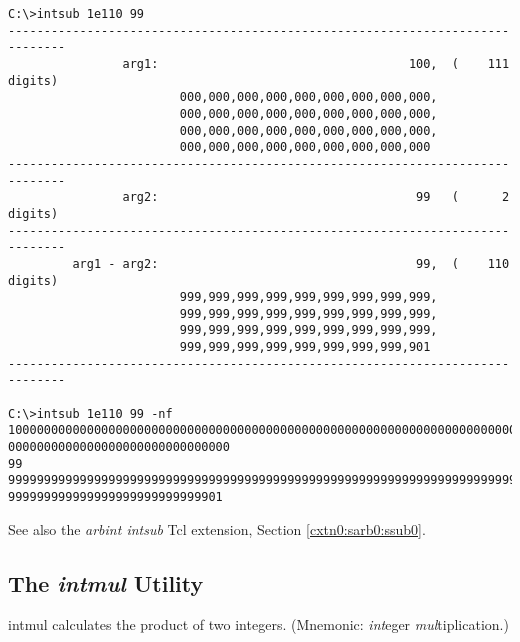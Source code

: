 \begin{dosutilcommandsampleinvocations}
\begin{scriptsize}
\begin{verbatim}
C:\>intsub 1e110 99
------------------------------------------------------------------------------
                arg1:                                   100,  (    111 digits)
                        000,000,000,000,000,000,000,000,000,
                        000,000,000,000,000,000,000,000,000,
                        000,000,000,000,000,000,000,000,000,
                        000,000,000,000,000,000,000,000,000
------------------------------------------------------------------------------
                arg2:                                    99   (      2 digits)
------------------------------------------------------------------------------
         arg1 - arg2:                                    99,  (    110 digits)
                        999,999,999,999,999,999,999,999,999,
                        999,999,999,999,999,999,999,999,999,
                        999,999,999,999,999,999,999,999,999,
                        999,999,999,999,999,999,999,999,901
------------------------------------------------------------------------------

C:\>intsub 1e110 99 -nf
10000000000000000000000000000000000000000000000000000000000000000000000000000000
0000000000000000000000000000000
99
99999999999999999999999999999999999999999999999999999999999999999999999999999999
999999999999999999999999999901
\end{verbatim}
\end{scriptsize}
\end{dosutilcommandsampleinvocations}

\begin{dosutilcommandseealso}
See also the \emph{arbint intsub} Tcl extension, 
Section \ref{cxtn0:sarb0:ssub0}.
\end{dosutilcommandseealso}


\subsection{The \emph{intmul} Utility}
\label{cdcm0:sali0:smul0}

\begin{dosutilcommandname}{intmul}%
calculates the product of
two integers.  (Mnemonic:  \emph{int}eger
\emph{mul}tiplication.)
\end{dosutilcommandname}

